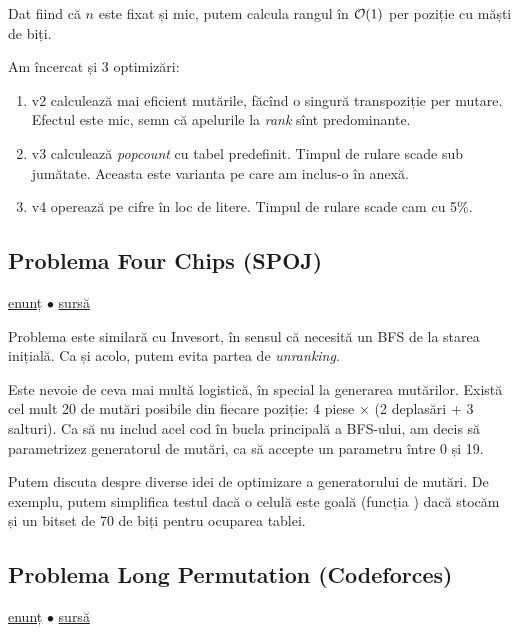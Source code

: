 \documentclass[../main.tex]{subfiles}
\begin{document}
Dat fiind că $n$ este fixat și mic, putem calcula rangul în  $\mathcal{O}(1)$ per poziție cu măști de biți.

Am încercat și 3 optimizări:

\begin{enumerate}
  \item v2 calculează mai eficient mutările, făcînd o singură transpoziție per mutare. Efectul este mic, semn că apelurile la \textit{rank} sînt predominante.

  \item v3 calculează \textit{popcount} cu tabel predefinit. Timpul de rulare scade sub jumătate. Aceasta este varianta pe care am inclus-o în anexă.

  \item v4 operează pe cifre în loc de litere. Timpul de rulare scade cam cu 5\%.
\end{enumerate}

\subsection{Problema Four Chips (SPOJ)}
\label{problem:four-chips}

\href{https://www.spoj.com/problems/ADV04F1/}{enunț}
$\bullet$
\hyperref[code:four-chips]{sursă}

Problema este similară cu Invesort, în sensul că necesită un BFS de la starea inițială. Ca și acolo, putem evita partea de \textit{unranking}.

Este nevoie de ceva mai multă logistică, în special la generarea mutărilor. Există cel mult 20 de mutări posibile din fiecare poziție: 4 piese $\times$ (2 deplasări + 3 salturi). Ca să nu includ acel cod în bucla principală a BFS-ului, am decis să parametrizez generatorul de mutări, ca să accepte un parametru între 0 și 19.

Putem discuta despre diverse idei de optimizare a generatorului de mutări. De exemplu, putem simplifica testul dacă o celulă este goală (funcția ) dacă stocăm și un bitset de 70 de biți pentru ocuparea tablei.

\subsection{Problema Long Permutation (Codeforces)}
\label{problem:long-permutation}

\href{https://codeforces.com/contest/1443/problem/E}{enunț}
$\bullet$
\hyperref[code:long-permutation]{sursă}
\end{document}
